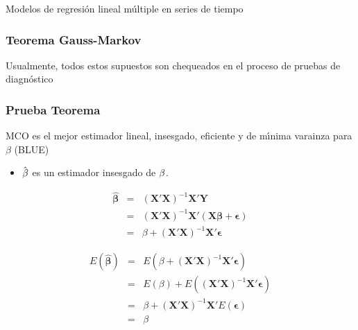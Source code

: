 \documentclass[xcolor=(list of options)]{beamer}
\begin{document}
\begin{section}{Modelos de regresi\'on lineal m\'ultiple en series de tiempo}
\begin{frame}
\end{frame}
\begin{frame}
\frametitle{Teorema Gauss-Markov}


Usualmente, todos estos supuestos son chequeados en el proceso de pruebas de diagn\'ostico

\end{frame}
\begin{frame}
\frametitle {Prueba Teorema}

MCO es el mejor estimador lineal, insesgado, eficiente y de m\'\i{}nima
varainza para $\beta$ (BLUE) 

\begin{itemize}
\item $\hat{\text{\ensuremath{\beta}}}$ es un estimador insesgado de $\text{\ensuremath{\beta}}$. 
\end{itemize}
\begin{eqnarray*}
\hat{\mathbf{\beta}} & = & (\mathbf{X'X})^{-1}\mathbf{X'Y}\\
 & = & (\mathbf{X'X})^{-1}\mathbf{X'}\left(\mathbf{X\beta}+\mathbf{\mathbf{\epsilon}}\right)\\
 & = & \beta+(\mathbf{X'X})^{-1}\mathbf{X'}\mathbf{\mathbf{\epsilon}}
\end{eqnarray*}

\begin{eqnarray*}
E\left(\hat{\mathbf{\beta}}\right) & = & E\left(\beta+(\mathbf{X'X})^{-1}\mathbf{X'}\mathbf{\mathbf{\epsilon}}\right)\\
 & = & E\left(\beta\right)+E\left((\mathbf{X'X})^{-1}\mathbf{X'}\mathbf{\mathbf{\epsilon}}\right)\\
 & = & \beta+(\mathbf{X'X})^{-1}\mathbf{X'}E\mathbf{\left(\mathbf{\epsilon}\right)}\\
 & = & \beta
\end{eqnarray*}


\end{frame}
\end{section}
\end{document}
